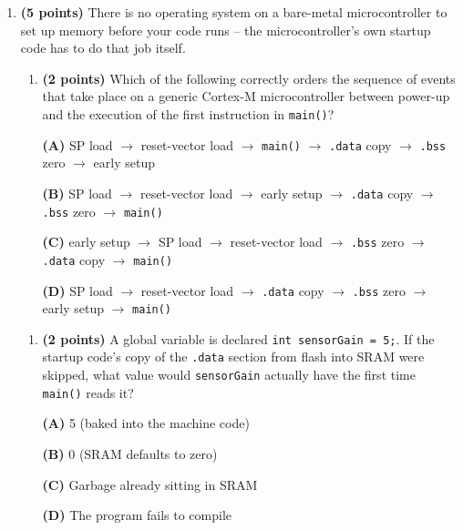 \documentclass[20pt]{extarticle}
\begin{document}
\begin{enumerate}[label=\textbf{\arabic*.}, leftmargin=*, itemsep=2pt]

\item \textbf{(5 points)} There is no operating system on a bare-metal microcontroller to set up memory before your code runs -- the microcontroller's own startup code has to do that job itself.

\begin{enumerate}[label=(\alph*), leftmargin=*, itemsep=6pt]
\item \textbf{(2 points)} Which of the following correctly orders the sequence of events that take place on a generic Cortex-M microcontroller between power-up and the execution of the first instruction in \texttt{main()}?

\begin{center}
\textbf{(A)} SP load $\to$ reset-vector load $\to$ \texttt{main()} $\to$ \texttt{.data} copy $\to$ \texttt{.bss} zero $\to$ early setup

\textbf{(B)} SP load $\to$ reset-vector load $\to$ early setup $\to$ \texttt{.data} copy $\to$ \texttt{.bss} zero $\to$ \texttt{main()}

\textbf{(C)} early setup $\to$ SP load $\to$ reset-vector load $\to$ \texttt{.bss} zero $\to$ \texttt{.data} copy $\to$ \texttt{main()}

\textbf{(D)} SP load $\to$ reset-vector load $\to$ \texttt{.data} copy $\to$ \texttt{.bss} zero $\to$ early setup $\to$ \texttt{main()}
\end{center}
\end{enumerate}

\newpage

\begin{enumerate}[resume, label=(\alph*), leftmargin=*, itemsep=6pt]
\item \textbf{(2 points)} A global variable is declared \texttt{int sensorGain = 5;}. If the startup code's copy of the \texttt{.data} section from flash into SRAM were skipped, what value would \texttt{sensorGain} actually have the first time \texttt{main()} reads it?

\begin{center}
\textbf{(A)} 5 (baked into the machine code)

\textbf{(B)} 0 (SRAM defaults to zero)

\textbf{(C)} Garbage already sitting in SRAM

\textbf{(D)} The program fails to compile
\end{center}


\end{enumerate}
\end{enumerate}
\end{document}
